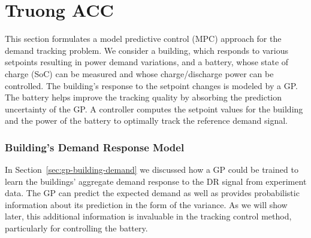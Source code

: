 
\section{Truong ACC}

This section formulates a model predictive control (MPC) approach for the demand tracking problem.
We consider a building, which responds to various setpoints resulting in power demand variations, and a battery, whose state of charge (SoC) can be measured and whose charge/discharge power can be controlled.
The building's response to the setpoint changes is modeled by a GP.
The battery helps improve the tracking quality by absorbing the prediction uncertainty of the GP.
A controller computes the setpoint values for the building and the power of the battery to optimally track the reference demand signal.


\subsubsection{Building's Demand Response Model}

In Section~\ref{sec:gp-building-demand} we discussed how a GP could be trained to learn the  buildings' aggregate demand response to the DR signal from experiment data. 
The GP  can predict the expected  demand  as well as provides probabilistic information about its prediction in the form of the variance.
As we will show later, this additional information is invaluable in the tracking control method, particularly for controlling the battery.

